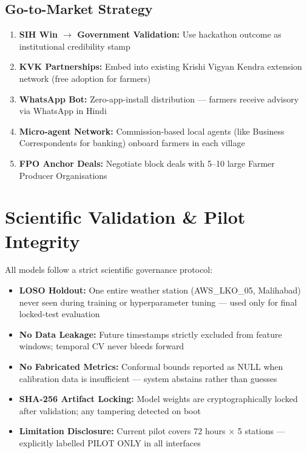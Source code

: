 \documentclass[12pt,a4paper]{article}
\begin{document}
\subsection{Go-to-Market Strategy}

\begin{enumerate}[leftmargin=*, noitemsep]
  \item \textbf{SIH Win $\rightarrow$ Government Validation:} Use hackathon outcome as institutional credibility stamp
  \item \textbf{KVK Partnerships:} Embed into existing Krishi Vigyan Kendra extension network (free adoption for farmers)
  \item \textbf{WhatsApp Bot:} Zero-app-install distribution --- farmers receive advisory via WhatsApp in Hindi
  \item \textbf{Micro-agent Network:} Commission-based local agents (like Business Correspondents for banking) onboard farmers in each village
  \item \textbf{FPO Anchor Deals:} Negotiate block deals with 5--10 large Farmer Producer Organisations
\end{enumerate}

\section{Scientific Validation \& Pilot Integrity}

All models follow a strict scientific governance protocol:

\begin{itemize}[leftmargin=*]
  \item \textbf{LOSO Holdout:} One entire weather station (AWS\_LKO\_05, Malihabad) never seen during training or hyperparameter tuning --- used only for final locked-test evaluation
  \item \textbf{No Data Leakage:} Future timestamps strictly excluded from feature windows; temporal CV never bleeds forward
  \item \textbf{No Fabricated Metrics:} Conformal bounds reported as NULL when calibration data is insufficient --- system abstains rather than guesses
  \item \textbf{SHA-256 Artifact Locking:} Model weights are cryptographically locked after validation; any tampering detected on boot
  \item \textbf{Limitation Disclosure:} Current pilot covers 72 hours $\times$ 5 stations --- explicitly labelled PILOT ONLY in all interfaces
\end{itemize}
\end{document}
